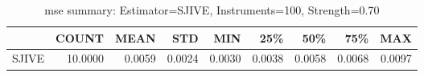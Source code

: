 \begin{table}[ht]
\centering
\caption{mse summary: Estimator=SJIVE, Instruments=100, Strength=0.70}
\begin{tabular}{lrrrrrrrr}
\toprule
 & COUNT & MEAN & STD & MIN & 25\% & 50\% & 75\% & MAX \\
\midrule
SJIVE & 10.0000 & 0.0059 & 0.0024 & 0.0030 & 0.0038 & 0.0058 & 0.0068 & 0.0097 \\
\bottomrule
\end{tabular}
\end{table}
